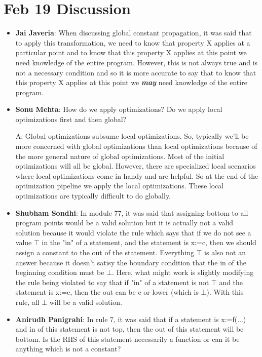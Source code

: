 \section{Feb 19 Discussion}
\begin{itemize}
    \item \textbf{Jai Javeria}: When discussing global constant propagation, it was said that to apply this transformation, we need to know that property X applies at a particular point and to know that this property X applies at this point we need knowledge of the entire program. However, this is not always true and is not a necessary condition and so it is more accurate to say that to know that this property X applies at this point we \textbf{\textit{may}} need knowledge of the entire program.
    
    \item \textbf{Sonu Mehta}: How do we apply optimizations? Do we apply local optimizations first and then global?

    A: Global optimizations subsume local optimizations. So, typically we'll be more concerned with global optimizations than local optimizations because of the more general nature of global optimizations. Most of the initial optimizations will all be global. However, there are specialized local scenarios where local optimizations come in handy and are helpful. So at the end of the optimization pipeline we apply the local optimizations. These local optimizations are typically difficult to do globally.
    
    \item \textbf{Shubham Sondhi}: In module 77, it was said that assigning bottom to all program points would be a valid solution but it is actually not a valid solution because it would violate the rule which says that if we do not see a value $\top$ in the "in" of a statement, and the statement is x:=c, then we should assign a constant to the out of the statement. Everything $\top$ is also not an answer because it doesn't satisy the boundary condition that the in of the beginning condition must be $\bot$. Here, what might work is slightly modifying the rule being violated to say that if "in" of a statement is not $\top$ and the statement is x:=c, then the out can be c or lower (which is $\bot$). With this rule, all $\bot$ will be a valid solution. 
    
    \item \textbf{Anirudh Panigrahi}: In rule 7, it was said that if a statement is x:=f(...) and in of this statement is not top, then the out of this statement will be bottom. Is the RHS of this statement necessarily a function or can it be anything which is not a constant?
    

\end{itemize}
